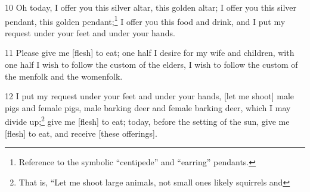 10 Oh today, I offer you this silver altar, this golden altar; I offer you this
silver pendant, this golden pendant;\footnote{Reference to the symbolic ``centipede'' and ``earring'' pendants.} I offer you this food and drink, and I
put my request under your feet and under your hands.

11 Please give me [flesh] to eat; one half I desire for my wife and children, with
one half I wish to follow the custom of the elders, I wish to follow the custom
of the menfolk and the womenfolk.

12 I put my request under your feet and under your hands, [let me shoot] male pigs
and female pigs, male barking deer and female barking deer, which I may divide
up;\footnote{That is, ``Let me shoot large animals, not small ones likely squirrels and} give me [flesh] to eat; today, before the setting of the sun, give me [flesh]
to eat, and receive [these offerings].

